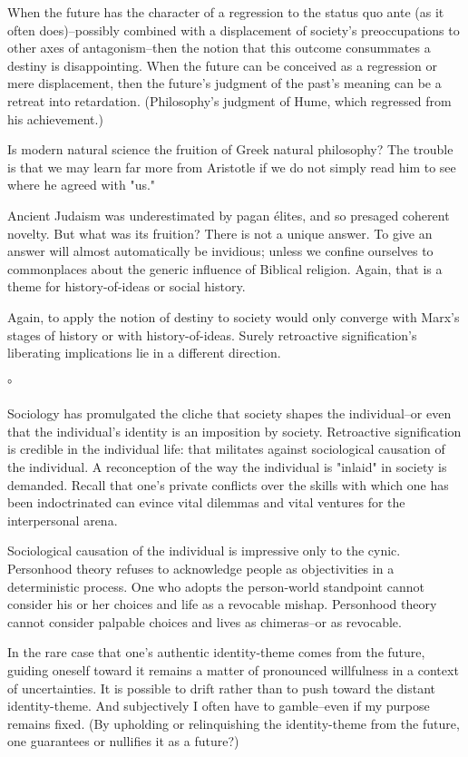 \begin{enumerate}[label=\alph*.]
When the future has the character of a regression to the status quo ante (as it often does)–possibly combined with a displacement of society’s preoccupations to other axes of antagonism–then the notion that this outcome consummates a destiny is disappointing. When the future can be conceived as a regression or mere displacement, then the future’s judgment of the past’s meaning can be a retreat into retardation. (Philosophy’s judgment of Hume, which regressed from his achievement.)

Is modern natural science the fruition of Greek natural philosophy? The trouble is that we may learn far more from Aristotle if we do not simply read him to see where he agreed with "us."

Ancient Judaism was underestimated by pagan élites, and so presaged coherent novelty. But what was its fruition? There is not a unique answer. To give an answer will almost automatically be invidious; unless we confine ourselves to commonplaces about the generic influence of Biblical religion. Again, that is a theme for history-of-ideas or social history.

Again, to apply the notion of destiny to society would only converge with Marx’s stages of history or with history-of-ideas. Surely retroactive signification’s liberating implications lie in a different direction.

°

Sociology has promulgated the cliche that society shapes the individual–or even that the individual’s identity is an imposition by society. Retroactive signification is credible in the individual life: that militates against sociological causation of the individual. A reconception of the way the individual is "inlaid" in society is demanded. Recall that one’s private conflicts over the skills with which one has been indoctrinated can evince vital dilemmas and vital ventures for the interpersonal arena.

Sociological causation of the individual is impressive only to the cynic. Personhood theory refuses to acknowledge people as objectivities in a deterministic process. One who adopts the person-world standpoint cannot consider his or her choices and life as a revocable mishap. Personhood theory cannot consider palpable choices and lives as chimeras–or as revocable.

In the rare case that one's authentic identity-theme comes from the future, guiding oneself toward it remains a matter of pronounced willfulness in a context of uncertainties. It is possible to drift rather than to push toward the distant identity-theme. And subjectively I often have to gamble–even if my purpose remains fixed. (By upholding or relinquishing the identity-theme from the future, one guarantees or nullifies it as a future?)


\end{enumerate}
